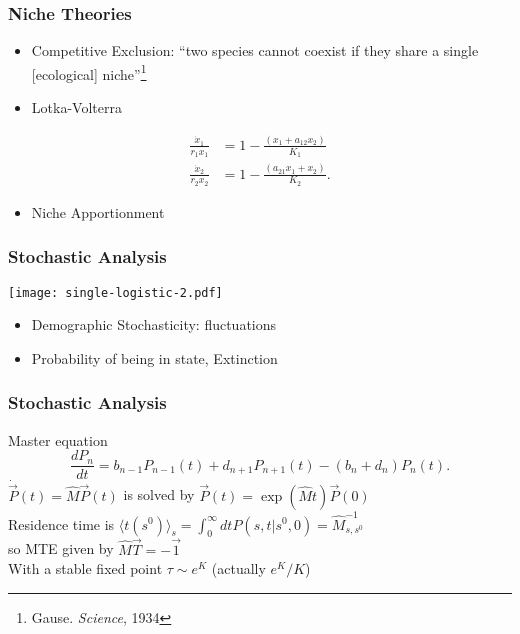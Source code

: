 \documentclass{beamer}
\begin{document}
\begin{frame}
\frametitle{Niche Theories}
\begin{itemize}
	\item Competitive Exclusion: ``two species cannot coexist if they share a single [ecological] niche''\footnote{Gause. \emph{Science}, 1934}
	\pause
	\item Lotka-Volterra
\end{itemize}
\begin{align*}
\frac{\dot{x}_1}{r_1 x_1} &= 1 - \frac{(x_1 + a_{12}x_2)}{K_1} \\
\frac{\dot{x}_2}{r_2 x_2} &= 1 - \frac{(a_{21}x_1 + x_2)}{K_2}. 
\end{align*}
\pause
\begin{itemize}
	\item Niche Apportionment
\end{itemize}
\end{frame}


\begin{frame}
\frametitle{Stochastic Analysis}
\centering
\texttt{[image: single-logistic-2.pdf]}
\begin{itemize}
	\item Demographic Stochasticity: fluctuations
	\pause
	\item Probability of being in state, Extinction
\end{itemize}
\end{frame}


\begin{frame}
\frametitle{Stochastic Analysis}
Master equation
\begin{equation*}
\frac{dP_n}{dt} =  b_{n-1}P_{n-1}(t) + d_{n+1}P_{n+1}(t) - (b_n+d_n)P_n(t).
\end{equation*}
\pause
$\dot{\vec{P}}(t) = \hat{M}\vec{P}(t)$ is solved by $\vec{P}(t)=\exp\left(\hat{M}t\right)\vec{P}(0)$ \\
\pause
Residence time is $\langle t(s^0)\rangle_s = \int_0^{\infty} dt P(s,t|s^0,0)=\hat{M}^{-1}_{s,s^0}$ \\
so MTE given by $\hat{M}\vec{T}=-\vec{1}$ \\
\pause
With a stable fixed point $\tau \sim e^K$ (actually $e^K/K$)
\end{frame}
\end{document}
